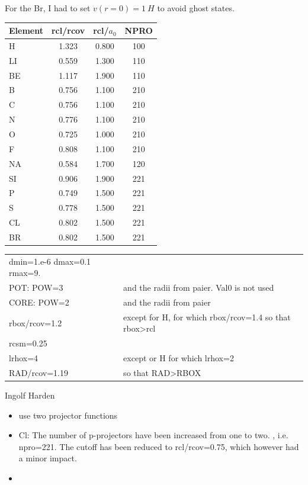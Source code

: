 \documentclass[11pt,a4paper]{report}
\begin{document}
For the Br, I had to set $v(r=0)=1~H$ to avoid ghost states.


\begin{tabular}{|l|c|c|c|}
\hline
Element  & rcl/rcov & rcl/$a_0$ & NPRO\\
\hline                            
H        &  1.323  &   0.800  &  100\\
LI       &  0.559  &   1.300  &  110\\
BE       &  1.117  &   1.900  &  110\\
B        &  0.756  &   1.100  &  210\\
C        &  0.756  &   1.100  &  210\\
N        &  0.776  &   1.100  &  210\\
O        &  0.725  &   1.000  &  210\\
F        &  0.808  &   1.100  &  210\\
NA       &  0.584  &   1.700  &  120\\
SI       &  0.906  &   1.900  &  221\\
P        &  0.749  &   1.500  &  221\\
S        &  0.778  &   1.500  &  221\\
CL       &  0.802  &   1.500  &  221\\
BR       &  0.802  &   1.500  &  221\\
\hline
\end{tabular}


\begin{tabular}{|l|l|}
\hline
dmin=1.e-6 dmax=0.1 rmax=9.&\\
POT:  POW=3   & and the radii from paier. Val0 is not used\\
CORE: POW=2   & and the radii from paier\\
rbox/rcov=1.2 & except for H, for which rbox/rcov=1.4 so that rbox>rcl\\
rcsm=0.25     & \\
lrhox=4       & except or H for which lrhox=2 \\
RAD/rcov=1.19 & so that RAD>RBOX\\
\hline
\end{tabular}


Ingolf Harden 
\begin{itemize}
\item use two projector functions 
\item Cl: The number of p-projectors have been increased from one to
  two.  , i.e. npro=221. The cutoff has been reduced to rcl/rcov=0.75,
  which however had a minor impact. 
\item
\end{itemize}
 
\end{document}
